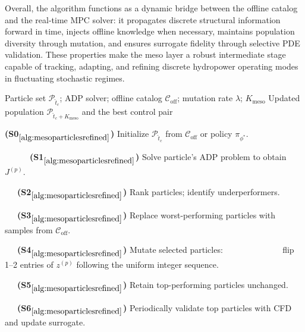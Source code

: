 \documentclass{article}
\newcommand{\1}{\mathds{1}}          %
\def\spc{~~~}
\theoremstyle{definition}
\begin{document}
\begin{sloppypar}
Overall, the algorithm functions as a dynamic bridge between the offline catalog and the
real-time MPC solver: it propagates discrete structural information forward in time,
injects offline knowledge when necessary, maintains population diversity through mutation,
and ensures surrogate fidelity through selective PDE validation.  
These properties make the meso layer a robust intermediate stage capable of tracking,
adapting, and refining discrete hydropower operating modes in fluctuating stochastic
regimes.


\begin{algorithm}[H]
	\caption{Meso-Scale Particle Evolution}
	\label{alg:mesoparticlesrefined}
	\begin{algorithmic}
		\Require Particle set $\mathcal{P}_{\hat t_c}$; ADP solver; 
		         offline catalog $\mathcal{C}_{\mathrm{off}}$; 
		         mutation rate $\lambda$; $K_{\mathrm{meso}}$
		\Ensure Updated population $\mathcal{P}_{\hat t_c+K_{\mathrm{meso}}}$ 
		        and the best control pair
		
		\Statex \textbf{(S0$_{\ref{alg:mesoparticlesrefined}}$)} 
		         Initialize $\mathcal{P}_{\hat t_c}$ from $\mathcal{C}_{\mathrm{off}}$ 
		         or policy $\pi_{\phi^*}$.
		
		
		        \Statex \spc\spc \textbf{(S1$_{\ref{alg:mesoparticlesrefined}}$)} 
		        Solve particle's ADP problem to obtain $J^{(p)}$.
		    \EndFor
		
		    \Statex \spc \textbf{(S2$_{\ref{alg:mesoparticlesrefined}}$)} 
		    Rank particles; identify underperformers.
		
		    \Statex \spc \textbf{(S3$_{\ref{alg:mesoparticlesrefined}}$)} 
		    Replace worst-performing particles with samples from $\mathcal{C}_{\mathrm{off}}$.
		
		    \Statex \spc \textbf{(S4$_{\ref{alg:mesoparticlesrefined}}$)} 
		    Mutate selected particles:
            \Statex ~ \spc \spc \spc \spc  flip 1--2 entries of $z^{(p)}$ 
                    following the uniform integer sequence.
		
		    \Statex \spc \textbf{(S5$_{\ref{alg:mesoparticlesrefined}}$)} 
		    Retain top-performing particles unchanged.
		
		    \Statex \spc \textbf{(S6$_{\ref{alg:mesoparticlesrefined}}$)} 
		    Periodically validate top particles with CFD and update surrogate.
		

\end{algorithmic}
\end{algorithm}
\end{sloppypar}
\end{document}

